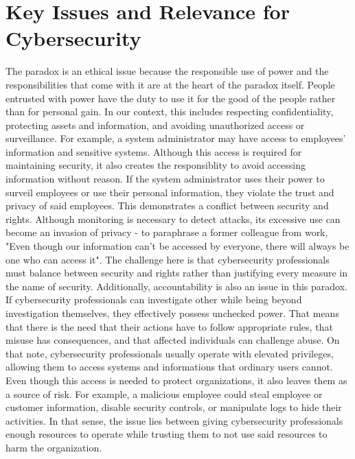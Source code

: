 \documentclass[12pt]{article}
\begin{document}
\section{Key Issues and Relevance for Cybersecurity}
The paradox is an ethical issue because the responsible use of power and the responsibilities that come with it are at the heart of the paradox itself. People entrusted with power have the duty to use it for the good of the people rather than for personal gain. In our context, this includes respecting confidentiality, protecting assets and information, and avoiding unauthorized access or surveillance.
\newline
For example, a system administrator may have access to employees' information and sensitive systems. Although this access is required for maintaining security, it also creates the responsiblity to avoid accessing information without reason. If the system administrator uses their power to surveil employees or use their personal information, they violate the trust and privacy of said employees.
\newline
This demonstrates a conflict between security and rights. Although monitoring is necessary to detect attacks, its excessive use can become an invasion of privacy - to paraphrase a former colleague from work, "Even though our information can't be accessed by everyone, there will always be one who can access it". The challenge here is that cybersecurity professionals must balance between security and rights rather than justifying every measure in the name of security.
\newline
Additionally, accountability is also an issue in this paradox. If cybersecurity professionals can investigate other while being beyond investigation themselves, they effectively possess unchecked power. That means that there is the need that their actions have to follow appropriate rules, that misuse has consequences, and that affected individuals can challenge abuse.
\newline
On that note, cybersecurity professionals usually operate with elevated privileges, allowing them to access systems and informations that ordinary users cannot. Even though this access is needed to protect organizations, it also leaves them as a source of risk.
\newline
For example, a malicious employee could steal employee or customer information, disable security controls, or manipulate logs to hide their activities. In that sense, the issue lies between giving cybersecurity professionals enough resources to operate while trusting them to not use said resources to harm the organization.
\end{document}
